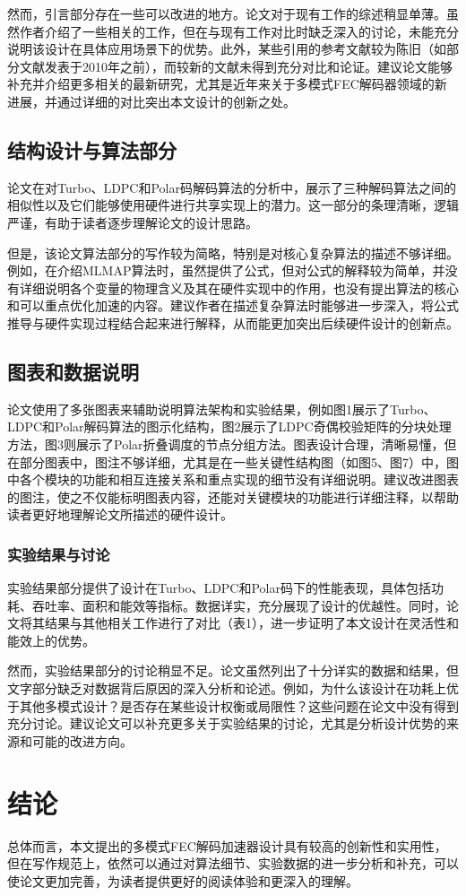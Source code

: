 \documentclass[12pt]{article}
\begin{document}
然而，引言部分存在一些可以改进的地方。论文对于现有工作的综述稍显单薄。虽然作者介绍了一些相关的工作，但在与现有工作对比时缺乏深入的讨论，未能充分说明该设计在具体应用场景下的优势。此外，某些引用的参考文献较为陈旧（如部分文献发表于2010年之前），而较新的文献未得到充分对比和论证。建议论文能够补充并介绍更多相关的最新研究，尤其是近年来关于多模式FEC解码器领域的新进展，并通过详细的对比突出本文设计的创新之处。

\subsection{结构设计与算法部分}
论文在对Turbo、LDPC和Polar码解码算法的分析中，展示了三种解码算法之间的相似性以及它们能够使用硬件进行共享实现上的潜力。这一部分的条理清晰，逻辑严谨，有助于读者逐步理解论文的设计思路。

但是，该论文算法部分的写作较为简略，特别是对核心复杂算法的描述不够详细。例如，在介绍MLMAP算法时，虽然提供了公式，但对公式的解释较为简单，并没有详细说明各个变量的物理含义及其在硬件实现中的作用，也没有提出算法的核心和可以重点优化加速的内容。建议作者在描述复杂算法时能够进一步深入，将公式推导与硬件实现过程结合起来进行解释，从而能更加突出后续硬件设计的创新点。

\subsection{图表和数据说明}
论文使用了多张图表来辅助说明算法架构和实验结果，例如图1展示了Turbo、LDPC和Polar解码算法的图示化结构，图2展示了LDPC奇偶校验矩阵的分块处理方法，图3则展示了Polar折叠调度的节点分组方法。图表设计合理，清晰易懂，但在部分图表中，图注不够详细，尤其是在一些关键性结构图（如图5、图7）中，图中各个模块的功能和相互连接关系和重点实现的细节没有详细说明。建议改进图表的图注，使之不仅能标明图表内容，还能对关键模块的功能进行详细注释，以帮助读者更好地理解论文所描述的硬件设计。

\subsubsection{实验结果与讨论}
实验结果部分提供了设计在Turbo、LDPC和Polar码下的性能表现，具体包括功耗、吞吐率、面积和能效等指标。数据详实，充分展现了设计的优越性。同时，论文将其结果与其他相关工作进行了对比（表1），进一步证明了本文设计在灵活性和能效上的优势。

然而，实验结果部分的讨论稍显不足。论文虽然列出了十分详实的数据和结果，但文字部分缺乏对数据背后原因的深入分析和论述。例如，为什么该设计在功耗上优于其他多模式设计？是否存在某些设计权衡或局限性？这些问题在论文中没有得到充分讨论。建议论文可以补充更多关于实验结果的讨论，尤其是分析设计优势的来源和可能的改进方向。


\section{结论}
总体而言，本文提出的多模式FEC解码加速器设计具有较高的创新性和实用性，但在写作规范上，依然可以通过对算法细节、实验数据的进一步分析和补充，可以使论文更加完善，为读者提供更好的阅读体验和更深入的理解。
\end{document}
